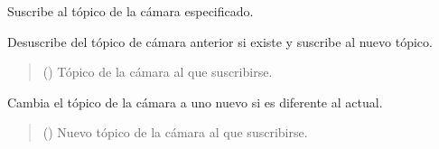 \documentclass[a4paper,10pt,spanish]{sphinxmanual}
\begin{document}
\begin{fulllineitems}
\begin{fulllineitems}
\begin{quote}
\begin{description}
\end{description}\end{quote}

\end{fulllineitems}


\begin{fulllineitems}
\label{\detokenize{squad_state_manager:squad_interfaz.InterfazManager.subscribe_to_camera}}
\pysigstartsignatures
{}
\pysigstopsignatures
\sphinxAtStartPar
Suscribe al tópico de la cámara especificado.

\sphinxAtStartPar
Desuscribe del tópico de cámara anterior si existe y suscribe al nuevo tópico.
\begin{quote}\begin{description}
\sphinxAtStartPar
{} () \textendash{} Tópico de la cámara al que suscribirse.

\end{description}\end{quote}

\end{fulllineitems}


\begin{fulllineitems}
\label{\detokenize{squad_state_manager:squad_interfaz.InterfazManager.switch_camera_topic}}
\pysigstartsignatures
{}
\pysigstopsignatures
\sphinxAtStartPar
Cambia el tópico de la cámara a uno nuevo si es diferente al actual.
\begin{quote}\begin{description}
\sphinxAtStartPar
{} () \textendash{} Nuevo tópico de la cámara al que suscribirse.


\end{description}
\end{quote}
\end{fulllineitems}
\end{fulllineitems}
\end{document}
